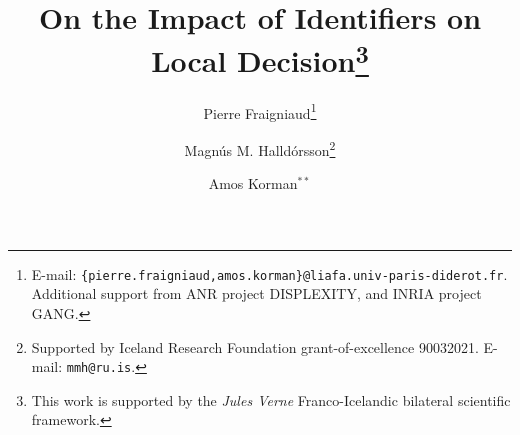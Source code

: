 \documentclass{llncs}
\begin{document}
\title{On the Impact of Identifiers on Local Decision\thanks{This work is supported by the \emph{Jules Verne}  Franco-Icelandic bilateral scientific framework.}}

\date{}

\author{
Pierre Fraigniaud\thanks{
E-mail: {\tt \{pierre.fraigniaud,amos.korman\}@liafa.univ-paris-diderot.fr}.
Additional support from  ANR project DISPLEXITY, and INRIA project GANG.}
\and Magn\'us M. Halld\'orsson\thanks{
Supported by Iceland Research Foundation grant-of-excellence 90032021.
E-mail: {\tt mmh@ru.is}.}
\and Amos Korman$^{**}$
}


\maketitle
\end{document}
